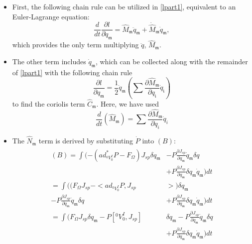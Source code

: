 \documentclass[lettersize,journal]{IEEEtran}
\begin{document}
\begin{itemize}
    \item First, the following chain rule can be utilized in \eqref{lpart1}, equivalent to an Euler-Lagrange equation:
\begin{equation}
    \frac{d}{dt}\frac{\partial l}{\partial \dot{q}_\mathfrak{m}}={\hat{M}}_\mathfrak{m}\ddot{q}_\mathfrak{m}+\dot{\hat{M}}_\mathfrak{m}\dot{q}_\mathfrak{m},
\end{equation}
which provides the only term multiplying $\ddot{q}$, $\hat{M}_\mathfrak{m}$.
\item The other term includes $\dot{q}_\mathfrak{m}$, which can be collected along with the remainder of \eqref{lpart1} with the following chain rule
\begin{equation}
    \frac{\partial l}{\partial q_\mathfrak{m}}=\frac{1}{2}\dot{q}_\mathfrak{m}(\sum\frac{\partial {\hat{M}}_\mathfrak{m}}{\partial q_\mathfrak{i}}\dot{q}_\mathfrak{i})
\end{equation}
to find the coriolis term $\hat{C}_\mathfrak{m}$. Here, we have used
\begin{equation}
    {\frac{d}{dt}(\hat{M}_\mathfrak{m})}=\sum\frac{\partial \hat{M}_\mathfrak{m}}{\partial{q}_i}\dot{q}_i
\end{equation}
\item The $\hat{N}_\mathfrak{m}$ term is derived by substituting $\dot{P}$ into $(B)$:
\begin{align}
\begin{split}
    (B) = \int (-(ad_{^0V^I_0}^*P-F_{\Omega})J_{sp}\delta q_\mathfrak{m}&-P\frac{\partial J_{sp}}{\partial q_\mathfrak{m}}\dot{q}_\mathfrak{m}\delta q\\
    &+P\frac{\partial J_{sp}}{\partial q_\mathfrak{m}}\delta q_\mathfrak{m} \dot{q}_\mathfrak{m})dt\\
    = \int ((F_{\Omega}J_{sp}-<ad_{{}^0V^I_0}P,J_{sp}&>)\delta q_\mathfrak{m}\\-P\frac{\partial J_{sp}}{\partial q_\mathfrak{m}}\dot{q}_\mathfrak{m}\delta q
    &+P\frac{\partial J_{sp}}{\partial q_\mathfrak{m}}\delta q_\mathfrak{m} \dot{q}_\mathfrak{m})dt\\
    = \int (F_{\Omega}J_{sp}\delta q_\mathfrak{m}-P[{}^0V^I_0,J_{sp}]&\delta q_\mathfrak{m}-P\frac{\partial J_{sp}}{\partial q_\mathfrak{m}}\dot{q}_\mathfrak{m}\delta q\\
    &+P\frac{\partial J_{sp}}{\partial q_\mathfrak{m}}\delta q_\mathfrak{m} \dot{q}_\mathfrak{m})dt
\end{split}
\end{align}

\end{itemize}
\end{document}
